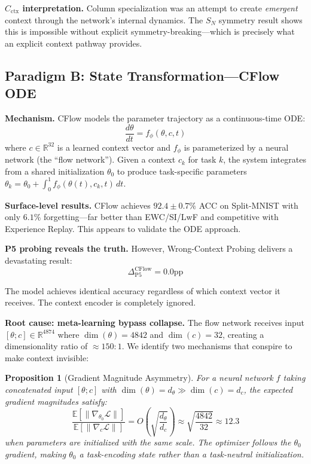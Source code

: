 \documentclass{article}
\newtheorem{proposition}[theorem]{Proposition}
\begin{document}
\textbf{$C_\mathrm{ctx}$ interpretation.} Column specialization was an attempt to create \emph{emergent} context through the network's internal dynamics. The $S_N$ symmetry result shows this is impossible without explicit symmetry-breaking---which is precisely what an explicit context pathway provides.

\subsection{Paradigm B: State Transformation---CFlow ODE}
\label{sec:cflow}

\textbf{Mechanism.} CFlow \citep{neuraldrift2026cflow} models the parameter trajectory as a continuous-time ODE:
\begin{equation}
    \frac{d\theta}{dt} = f_\phi(\theta, c, t)
\end{equation}
where $c \in \mathbb{R}^{32}$ is a learned context vector and $f_\phi$ is parameterized by a neural network (the ``flow network''). Given a context $c_k$ for task $k$, the system integrates from a shared initialization $\theta_0$ to produce task-specific parameters $\theta_k = \theta_0 + \int_0^1 f_\phi(\theta(t), c_k, t)\,dt$.

\textbf{Surface-level results.} CFlow achieves $92.4 \pm 0.7\%$ ACC on Split-MNIST with only $6.1\%$ forgetting---far better than EWC/SI/LwF and competitive with Experience Replay. This appears to validate the ODE approach.

\textbf{P5 probing reveals the truth.} However, Wrong-Context Probing delivers a devastating result:
\begin{equation}
    \Delta_\mathrm{P5}^\mathrm{CFlow} = 0.0 \text{pp}
\end{equation}

The model achieves identical accuracy regardless of which context vector it receives. The context encoder is completely ignored.

\textbf{Root cause: meta-learning bypass collapse.} The flow network receives input $[\theta; c] \in \mathbb{R}^{4874}$ where $\dim(\theta) = 4842$ and $\dim(c) = 32$, creating a dimensionality ratio of $\approx 150{:}1$. We identify two mechanisms that conspire to make context invisible:

\begin{proposition}[Gradient Magnitude Asymmetry]
\label{prop:grad_asymmetry}
For a neural network $f$ taking concatenated input $[\theta; c]$ with $\dim(\theta) = d_\theta \gg \dim(c) = d_c$, the expected gradient magnitudes satisfy:
\begin{equation}
    \frac{\mathbb{E}\left[\|\nabla_{\theta_0} \mathcal{L}\|\right]}{\mathbb{E}\left[\|\nabla_c \mathcal{L}\|\right]} = O\!\left(\sqrt{\frac{d_\theta}{d_c}}\right) \approx \sqrt{\frac{4842}{32}} \approx 12.3
\end{equation}
when parameters are initialized with the same scale. The optimizer follows the $\theta_0$ gradient, making $\theta_0$ a \emph{task-encoding state} rather than a task-neutral initialization.
\end{proposition}
\end{document}
